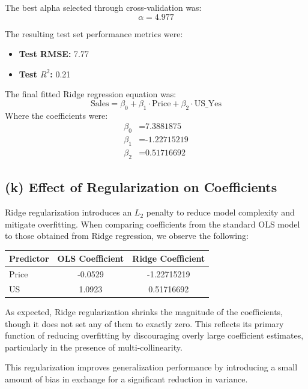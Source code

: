 \documentclass[12pt]{article}
\begin{document}
The best alpha selected through cross-validation was:
\[
\alpha = \boxed{4.977}
\]

\noindent The resulting test set performance metrics were:
\begin{itemize}
    \item \textbf{Test RMSE:} 7.77
    \item \textbf{Test $R^2$:} 0.21
\end{itemize}

\noindent The final fitted Ridge regression equation was:
\[
\text{Sales} = \beta_0 + \beta_1 \cdot \text{Price} + \beta_2 \cdot \text{US\_Yes}
\]
Where the coefficients were:
\begin{align*}
\beta_0 &= \text{7.3881875} \\
\beta_1 &= \text{-1.22715219} \\
\beta_2 &= \text{0.51716692}
\end{align*}

\subsection*{(k) Effect of Regularization on Coefficients}

Ridge regularization introduces an $L_2$ penalty to reduce model complexity and mitigate overfitting. When comparing coefficients from the standard OLS model to those obtained from Ridge regression, we observe the following:

\begin{table}[]
\centering
\begin{tabular}{lcc}
\toprule
\textbf{Predictor} & \textbf{OLS Coefficient} & \textbf{Ridge Coefficient} \\
\midrule
Price & -0.0529 & -1.22715219 \\
US    & 1.0923  & 0.51716692 \\
\bottomrule
\end{tabular}
\end{table}

\noindent As expected, Ridge regularization shrinks the magnitude of the coefficients, though it does not set any of them to exactly zero. This reflects its primary function of reducing overfitting by discouraging overly large coefficient estimates, particularly in the presence of multi-collinearity.

This regularization improves generalization performance by introducing a small amount of bias in exchange for a significant reduction in variance.
\end{document}
